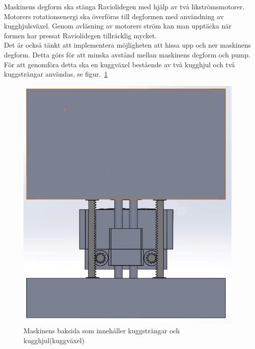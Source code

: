 Maskinens degform ska stänga Raviolidegen med hjälp av två likströmsmotorer. Motorers rotationsenergi ska överföras till degformen med användning av kugghjulsväxel.  Genom avläsning av motorers ström kan man upptäcka när formen har pressat Raviolidegen tillräcklig mycket.\\

Det är också tänkt att implementera möjligheten att hissa upp och ner maskinens degform. Detta görs för att minska avstånd mellan maskinens degform och pump. För att genomföra detta ska en kuggväxel bestående av två kugghjul och två kuggsträngar användas, se figur.~\ref{maskinens_baksida_metod}

\begin{figure}[ht]
	\begin{center}
		\includegraphics[scale=0.8]{images/maskinenshiss.jpg}
		\caption{Maskinens baksida som innehåller kuggsträngar och kugghjul(kuggväxel)}
		\label{maskinens_baksida_metod}	
	\end{center}
\end{figure}
